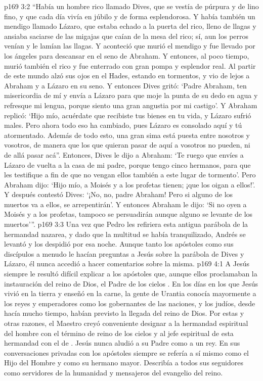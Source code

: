 \vs p169 3:2 “Había un hombre rico llamado Dives, que se vestía de púrpura y de lino fino, y que cada día vivía en júbilo y de forma esplendorosa. Y había también un mendigo llamado Lázaro, que estaba echado a la puerta del rico, lleno de llagas y ansiaba saciarse de las migajas que caían de la mesa del rico; sí, aun los perros venían y le lamían las llagas. Y aconteció que murió el mendigo y fue llevado por los ángeles para descansar en el seno de Abraham. Y entonces, al poco tiempo, murió también el rico y fue enterrado con gran pompa y esplendor real. Al partir de este mundo alzó sus ojos en el Hades, estando en tormentos, y vio de lejos a Abraham y a Lázaro en su seno. Y entonces Dives gritó: ‘Padre Abraham, ten misericordia de mí y envía a Lázaro para que moje la punta de su dedo en agua y refresque mi lengua, porque siento una gran angustia por mi castigo’. Y Abraham replicó: ‘Hijo mío, acuérdate que recibiste tus bienes en tu vida, y Lázaro sufrió males. Pero ahora todo eso ha cambiado, pues Lázaro es consolado aquí y tú atormentado. Además de todo esto, una gran sima está puesta entre nosotros y vosotros, de manera que los que quieran pasar de aquí a vosotros no pueden, ni de allá pasar acá”. Entonces, Dives le dijo a Abraham: ‘Te ruego que envíes a Lázaro de vuelta a la casa de mi padre, porque tengo cinco hermanos, para que les testifique a fin de que no vengan ellos también a este lugar de tormento’. Pero Abraham dijo: ‘Hijo mío, a Moisés y a los profetas tienen; ¡que los oigan a ellos!’. Y después contestó Dives: ‘¡No, no, padre Abraham! Pero si alguno de los muertos va a ellos, se arrepentirán’. Y entonces Abraham le dijo: ‘Si no oyen a Moisés y a los profetas, tampoco se persuadirán aunque alguno se levante de los muertos’”.
\vs p169 3:3 Una vez que Pedro les refiriera esta antigua parábola de la hermandad nazarea, y dado que la multitud se había tranquilizado, Andrés se levantó y los despidió por esa noche. Aunque tanto los apóstoles como sus discípulos a menudo le hacían preguntas a Jesús sobre la parábola de Dives y Lázaro, él nunca accedió a hacer comentarios sobre la misma.
\vs p169 4:1 A Jesús siempre le resultó difícil explicar a los apóstoles que, aunque ellos proclamaban la instauración del reino de Dios, el Padre de los cielos . En los días en los que Jesús vivió en la tierra y enseñó en la carne, la gente de Urantia conocía mayormente a los reyes y emperadores como los gobernantes de las naciones, y los judíos, desde hacía mucho tiempo, habían previsto la llegada del reino de Dios. Por estas y otras razones, el Maestro creyó conveniente designar a la hermandad espiritual del hombre con el término de reino de los cielos y al jefe espiritual de esta hermandad con el de . Jesús nunca aludió a su Padre como a un rey. En sus conversaciones privadas con los apóstoles siempre se refería a sí mismo como el Hijo del Hombre y como su hermano mayor. Describía a todos sus seguidores como servidores de la humanidad y mensajeros del evangelio del reino.
